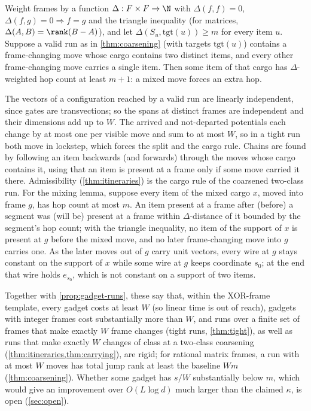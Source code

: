 \begin{theorem}\label{thm:mixing}
Weight frames by a function $\Delta:F\times F\to\N$ with $\Delta(f,f)=0$, $\Delta(f,g)=0\Rightarrow f=g$ and the triangle inequality (for
matrices, $\Delta(A,B)=\rank(B-A)$), and let $\Delta(S_u,\mathrm{tgt}(u))\ge m$ for every item $u$. Suppose a
valid run as in \cref{thm:coarsening} (with targets $\mathrm{tgt}(u)$) contains a frame-changing move whose cargo contains two distinct items, and every other frame-changing move carries a single item. Then some item of that cargo has
$\Delta$-weighted hop count at least $m+1$: a mixed move forces an extra hop.
\end{theorem}

\begin{outline}
The vectors of a configuration reached by a valid run are linearly independent, since gates are
transvections; so the spans at distinct frames are independent and their dimensions add up to $W$. The
arrived and not-departed potentials each change by at most one per visible move and sum to at most $W$, so in
a tight run both move in lockstep, which forces the split and the cargo rule. Chains are found by following an
item backwards (and forwards) through the moves whose cargo contains it, using that an item is present at a
frame only if some move carried it there. Admissibility (\cref{thm:itineraries}) is the cargo rule of the coarsened two-class run. For the mixing
lemma, suppose every item of the mixed cargo $x$, moved into frame $g$, has hop count at most $m$. An item
present at a frame after (before) a segment was (will be) present at a frame within $\Delta$-distance of it
bounded by the segment's hop count; with the triangle inequality, no item of the support of $x$ is present at
$g$ before the mixed move, and no later frame-changing move into $g$ carries one. As the later moves out of
$g$ carry unit vectors, every wire at $g$ stays constant on the support of $x$ while some wire at $g$ keeps
coordinate $s_0$; at the end that wire holds $e_{s_0}$, which is not constant on a support of two items.
\end{outline}

Together with \cref{prop:gadget-runs}, these say that, within the XOR-frame template, every gadget costs at least $W$ (so linear time is out of reach), gadgets with integer frames cost substantially more than $W$, and runs over a finite set of frames that make exactly $W$ frame changes (tight runs, \cref{thm:tight}), as well as runs that make exactly $W$ changes of class at a two-class coarsening (\cref{thm:itineraries,thm:carrying}), are rigid; for rational matrix frames, a run with at most $W$ moves has total jump rank at least the baseline $Wm$ (\cref{thm:coarsening}). Whether some gadget has $s/W$ substantially below $m$, which would give an improvement
over $O(L\log d)$ much larger than the claimed $\kappa$, is open (\cref{sec:open}).
